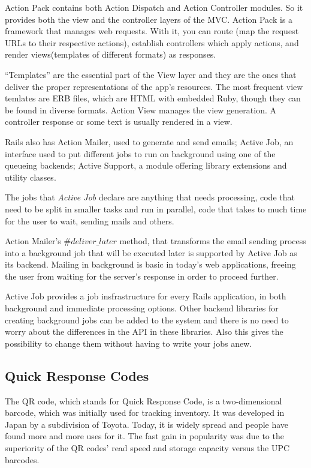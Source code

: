 Action Pack contains both Action Dispatch and Action Controller modules. So it provides both the view and the controller layers of the MVC. Action Pack is a framework that manages web requests. With it, you can route (map the request URLs to their respective actions), establish controllers which apply actions, and render views(templates of different formats) as responses.

``Templates'' are the essential part of the View layer and they are the ones that deliver the  proper representations of the app's resources. The most frequent view temlates are ERB files, which are HTML with embedded Ruby, though they can be found in diverse formats. Action View manages the view generation. A controller response or some text is usually rendered in a view.
 
Rails also has Action Mailer, used to generate and send emails; Active Job, an interface used to put different jobs to run on background using one of the queueing backends; Active Support, a module offering library extensions and utility classes.

The jobs that \textit{Active Job} declare are anything that needs processing, code that need to be split in smaller tasks and run in parallel, code that takes to much time for the user to wait, sending mails and others. 

Action Mailer's $\#deliver\_later$ method, that transforms the email sending process into a background job that will be executed later is supported by Active Job as its backend. Mailing in background is basic in today's web applications, freeing the user from waiting for the server's response in order to proceed further.
  
Active Job provides a job insfrastructure for every Rails application, in both background and immediate processing options. Other backend libraries for creating background jobs can be added to the system and there is no need to worry about the differences in the API in these libraries. Also this gives the possibility to change them without having to write your jobs anew.




\subsection{Quick Response Codes}
The QR code, which stands for Quick Response Code, is a two-dimensional barcode, which was initially used for tracking inventory. It was developed in Japan by a subdivision of Toyota. Today, it is widely spread and people have found more and more uses for it. The fast gain in popularity was due to the superiority of the QR codes’ read speed and storage capacity versus the UPC barcodes.

